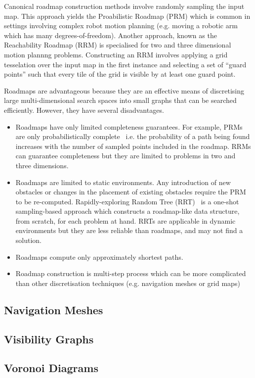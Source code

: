 Canonical roadmap construction methods involve randomly sampling the input map. 
This approach yields the Proabilistic Roadmap (PRM) which is common in settings 
involving complex robot motion planning (e.g. moving a robotic arm which has many 
degrees-of-freedom).
Another approach, known as the Reachability Roadmap (RRM) is specialised for two 
and three dimensional motion plannng problems.
Constructing an RRM involves applying a grid tesselation over the input map in the 
first instance and selecting a set of ``guard points'' such that every tile of the 
grid is visible by at least one guard point.

Roadmaps are advantageous because they are an effective means of discretising large
multi-dimensional search spaces into small graphs that can be searched 
efficiently. However, they have several disadvantages. 
\begin{itemize}
\item{Roadmaps have only limited completeness guarantees. For example, PRMs are only 
probabilistically complete~\citep{barraquand97} i.e. the probability 
of a path being found increases with the number of sampled points included in the 
roadmap.
RRMs can guarantee completeness but they are limited to problems in two and three 
dimensions.}
\item{Roadmaps are limited to static environments. Any introduction
of new obstacles or changes in the placement of existing obstacles require the PRM
to be re-computed. Rapidly-exploring Random Tree (RRT)~\citep{lavalle98} 
is a one-shot sampling-based approach which constructs a roadmap-like data structure,
from scratch, for each problem at hand.
RRTs are applicable in dynamic environments but they are less reliable than roadmaps,
and may not find a solution.}
\item{Roadmaps compute only approximately shortest paths.}
\item{Roadmap construction is multi-step process which can be more complicated than 
other discretisation techniques (e.g. navigation meshes or grid maps)}
\end{itemize}

\subsection{Navigation Meshes}
\label{cha::lit::graphs::nav}

\subsection{Visibility Graphs}
\label{cha::lit::graphs::vis}

\subsection{Voronoi Diagrams}
\label{cha::lit::graphs::voronoi}


